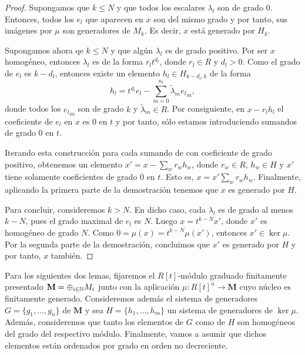 \begin{proof}
	Supongamos que $k \leq N$ y que todos los escalares $\lambda_{l}$ son de grado
	$0$. Entonces, todos los $e_{l}$ que aparecen en $x$ son del mismo grado y por
	tanto, sus imágenes por $\mu$ son generadores de $M_{k}$. Es decir, $x$ está generado
	por $H_{k}$.
	
	Supongamos ahora qe $k \leq N$ y que algún $\lambda_{l}$ es de grado positivo.
	Por ser $x$ homogéneo, entonces $\lambda_{l}$ es de la forma $r_{l} t^{d_l}$,
	donde $r_{l} \in R$ y $d_{l} > 0$. Como el grado de $e_{l}$ es $k - d_{l}$,
	entonces existe un elemento $h_{l} \in H_{k-d_l,k}$ de la forma
	\[
	h_{l} = t^{d_l}e_{l} - \sum_{m=0}^{n_l}\tilde{\lambda}_{m}{e_l}_{m},
	\]
	donde todos los ${e_l}_{m}$ son de grado $k$ y $\tilde{\lambda}_{m} \in R$. Por
	consiguiente, en $x - r_{l} h_{l}$ el coeficiente de $e_{l}$ en $x$ es $0$ en
	$t$ y por tanto, sólo estamos introduciendo sumandos de grado $0$ en $t$.
	
	Iterando esta construcción para cada sumando de con coeficiente de grado positivo,
	obtenemos un elemento $x' = x - \sum_{w} r_{w} h_{w}$, donde $r_{w} \in R$,
	$h_{w} \in H$ y $x'$ tiene solamente coeficientes de grado $0$ en $t$. Esto es,
	$x = x' \sum_{w} r_{w} h_{w}$. Finalmente, aplicando la primera parte de la
	demostración tenemos que $x$ es generado por $H$.
	
	Para concluir, consideremos $k > N$. En dicho caso, cada $\lambda_{l}$ es de grado
	al menos $k - N$, pues el grado maximal de $e_{l}$ es $N$. Luego $x = t^{k-N}x'$,
	donde $x'$ es homogéneo de grado $N$. Como $0 = \mu(x) = t^{k-N}\mu(x')$,
	entonces $x' \in \ker \mu$. Por la segunda parte de la demostración,
	concluimos que $x'$ es generado por $H$ y por tanto, $x$ también.
\end{proof}

Para los siguientes dos lemas, fijaremos el $R[t]$-módulo graduado finitamente presentado
$\mathbf{M}= \oplus_{i \in \mathbb{N}}M_{i}$ junto con la aplicación $\mu : R[t]^{n} \to
\mathbf{M}$ cuyo núcleo es finitamente generado. Consideremos además el sistema
de generadores $G = \{g_{1}, \ldots, g_{n}\}$ de $\mathbf{M}$ y sea
$H = \{h_{1}, \ldots, h_{m}\}$ un sistema de generadores de $\ker \mu$. Además,
consideremos que tanto los elementos de $G$ como de $H$ son homogéneos del grado
del respectivo módulo. Finalmente, vamos a asumir que dichos elementos están
ordenados por grado en orden no decreciente.

